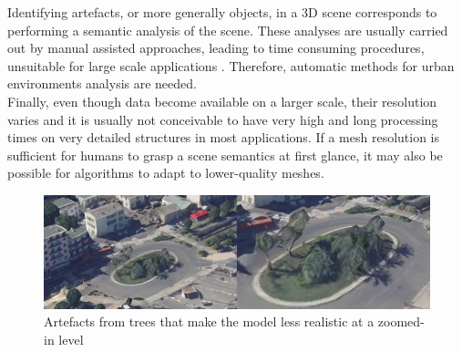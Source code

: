 \documentclass{kththesis}
\begin{document}
Identifying artefacts, or more generally objects, in a 3D scene corresponds to performing a semantic analysis of the scene. These analyses are usually carried out by manual assisted approaches, leading to
time consuming procedures, unsuitable for large scale applications \parencite{verdie}. Therefore, automatic methods for urban environments analysis are needed. \\
Finally, even though data become available on a larger scale, their resolution varies and it is usually not conceivable to have very high and long processing times on very detailed structures in most applications. If a mesh resolution is sufficient for humans to grasp a scene semantics at first glance, it  may also be possible for algorithms to adapt to lower-quality meshes. 

\begin{figure}[H]
    \centering
    \includegraphics[width=\textwidth]{images/Stadsmiljo.png}
    \caption{Artefacts from trees that make the model less realistic at a zoomed-in level}
    \label{fig:stadsmiljo}
\end{figure}
\end{document}
